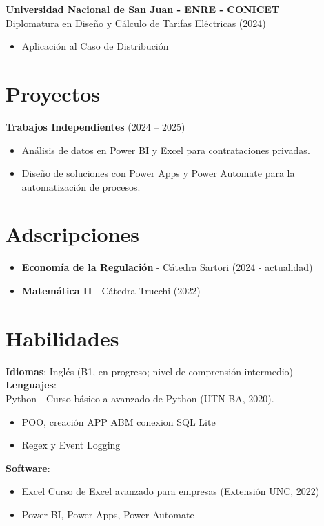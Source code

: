 \documentclass[a4paper,10pt]{article}
\begin{document}
\textbf{Universidad Nacional de San Juan - ENRE - CONICET} \\
 Diplomatura en Diseño y Cálculo de Tarifas Eléctricas (2024)
 \begin{itemize}
 \item Aplicación al Caso de Distribución 
\end{itemize}
\section*{Proyectos}
\textbf{Trabajos Independientes} (2024 – 2025) 
\begin{itemize} 
\item An\'alisis de datos en Power BI y Excel para contrataciones privadas.
    \item Dise\~no de soluciones con Power Apps y Power Automate para la automatizaci\'on de procesos.
\end{itemize}

\section*{Adscripciones}
\begin{itemize}
    \item \textbf{Econom\'ia de la Regulaci\'on} - Cátedra Sartori (2024 - actualidad)
    \item \textbf{Matemática II} - Cátedra Trucchi (2022)
\end{itemize}

\section*{Habilidades}
\textbf{Idiomas}: Ingl\'es (B1, en progreso; nivel de comprensi\'on intermedio) \\
\textbf{Lenguajes}: \\Python - Curso b\'asico a avanzado de Python (UTN-BA, 2020).
\begin{itemize}
    \item POO, creación APP ABM conexion SQL Lite
    \item Regex y Event Logging
\end{itemize}
\textbf{Software}:
\begin{itemize}
    \item Excel Curso de Excel avanzado para empresas (Extensi\'on UNC, 2022) 
    \item Power BI, Power Apps, Power Automate 
\end{itemize}
\end{document}
